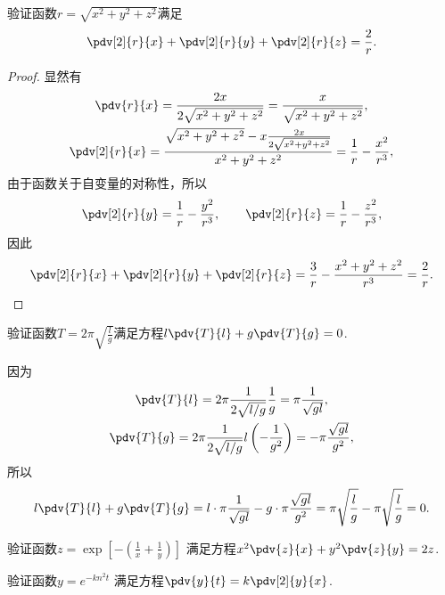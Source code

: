 \begin{example}
验证函数\(r = \sqrt{x^2+y^2+z^2}\)满足\begin{equation*}
	\pdv[2]{r}{x} + \pdv[2]{r}{y} + \pdv[2]{r}{z} = \frac{2}{r}.
\end{equation*}
\begin{proof}
显然有\begin{gather*}
	\pdv{r}{x} = \frac{2x}{2\sqrt{x^2+y^2+z^2}} = \frac{x}{\sqrt{x^2+y^2+z^2}}, \\
	\pdv[2]{r}{x} = \frac{\sqrt{x^2+y^2+z^2}-x\frac{2x}{2\sqrt{x^2+y^2+z^2}}}{x^2+y^2+z^2}
	= \frac{1}{r} - \frac{x^2}{r^3},
\end{gather*}
由于函数关于自变量的对称性，所以\begin{equation*}
	\pdv[2]{r}{y} = \frac{1}{r} - \frac{y^2}{r^3},
	\qquad
	\pdv[2]{r}{z} = \frac{1}{r} - \frac{z^2}{r^3},
\end{equation*}
因此\begin{equation*}
	\pdv[2]{r}{x} + \pdv[2]{r}{y} + \pdv[2]{r}{z}
	= \frac{3}{r} - \frac{x^2+y^2+z^2}{r^3}
	= \frac{2}{r}.
	\qedhere
\end{equation*}
\end{proof}
\end{example}

\begin{example}
验证函数\(T = 2\pi\sqrt{\frac{l}{g}}\)满足方程\(l\pdv{T}{l}+g\pdv{T}{g}=0\).
\begin{solution}
因为\begin{gather*}
	\pdv{T}{l} = 2\pi \frac{1}{2\sqrt{l/g}} \frac{1}{g}
	= \pi \frac{1}{\sqrt{gl}}, \\
	\pdv{T}{g} = 2\pi \frac{1}{2\sqrt{l/g}} l \left(-\frac{1}{g^2}\right)
	= -\pi \frac{\sqrt{gl}}{g^2},
\end{gather*}
所以\begin{equation*}
	l \pdv{T}{l} + g \pdv{T}{g}
	= l \cdot \pi \frac{1}{\sqrt{gl}} - g \cdot \pi \frac{\sqrt{gl}}{g^2}
	= \pi \sqrt{\frac{l}{g}} - \pi \sqrt{\frac{l}{g}} = 0.
\end{equation*}
\end{solution}
\end{example}

\begin{example}
验证函数\(z = \exp[-\left(\frac{1}{x}+\frac{1}{y}\right)]\)
满足方程\(x^2 \pdv{z}{x} + y^2 \pdv{z}{y} = 2z\).
\end{example}

\begin{example}
验证函数\(y = e^{-k n^2 t}\)
满足方程\(\pdv{y}{t} = k \pdv[2]{y}{x}\).
\end{example}

